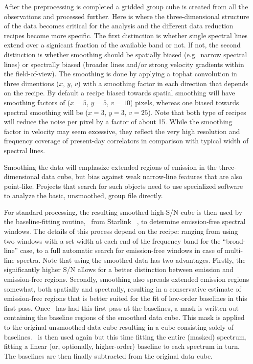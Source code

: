 \documentclass[final,authoryear,5p,times,twocolumn]{elsarticle}
\begin{document}
After the preprocessing is completed a gridded group cube is created
from all the observations and processed further. Here is where the
three-dimensional structure of the data becomes critical for the analysis
and the different data reduction recipes become more specific. The first
distinction is whether single spectral lines extend over a signicant
fraction of the available band or not. If not, the second distinction
is whether smoothing should be spatially biased (e.g.\ narrow spectral
lines) or spectrally biased (broader lines and/or strong velocity
gradients within the field-of-view). The smoothing is done by applying
a tophat convolution in three dimentions ($x$, $y$, $v$) with a smoothing
factor in each direction that depends on the recipe.  By default a
recipe biased towards spatial smoothing will have smoothing factors of
($x=5$, $y=5$, $v=10$) pixels, whereas one biased towards spectral smoothing
will be ($x=3$, $y=3$, $v=25$). Note that both type of recipes will reduce
the noise per pixel by a factor of about 15. While the smoothing
factor in velocity may seem excessive, they reflect the very high
resolution and frequency coverage of present-day correlators in
comparison with typical width of spectral lines.

Smoothing the data will emphasize extended regions of emission in the
three-dimensional data cube, but bias against weak narrow-line features that are also
point-like. Projects that search for such objects need to use specialized
software to analyze the basic, unsmoothed, group file directly.

For standard processing, the resulting smoothed high-S/N cube
is then used by the baseline-fitting routine, \mfittrend\ from
Starlink \KAPPA\ \citep[][, see \S\ref{sec:mfittrend}]{SUN95,2008ASPC..394..650C},
to determine emission-free spectral windows.
The details of this process depend on the recipe: ranging from using two
windows with a set width at each end of the frequency band
for the ``broad-line'' case, to a full automatic search for emission-free
windows in case of multi-line spectra. Note that using the smoothed data has
two advantages. Firstly, the significantly higher S/N allows for a better
distinction between emission and emission-free regions. Secondly, smoothing
also spreads extended emission regions somewhat, both spatially and spectrally,
resulting in a conservative estimate of emission-free regions that is better suited for
the fit of low-order baselines in this first pass. Once \mfittrend\ has
had this first pass at the baselines, a mask is written out containing the
baseline regions of the smoothed data cube. This mask is applied to the original
unsmoothed data cube resulting in a cube consisting solely of
baselines. \mfittrend\ is then used again but this time fitting
the entire (masked) spectrum, fitting a linear (or, optionally, higher-order) baseline
to each spectrum in turn. The baselines are then finally subtracted from the
original data cube.
\end{document}
